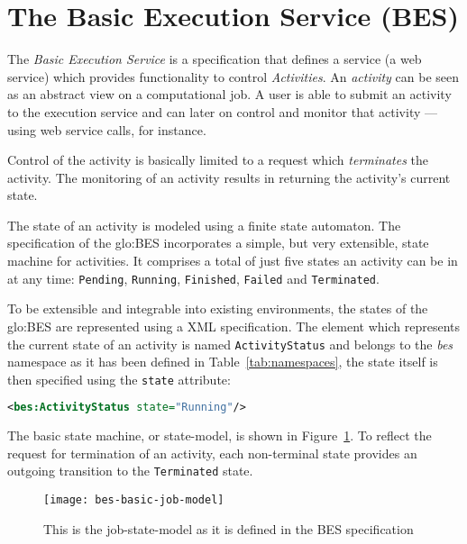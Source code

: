 \section[The Basic Execution Service]{The Basic Execution Service (BES)}
\label{sec:fundamentals:bes}

The \emph{Basic Execution Service} \cite{ogsa-bes} is a specification that
defines  a service  (\eg a  web service)  which provides  functionality to
control \emph{Activities}.  An \emph{activity}  can be seen as an abstract
view on a computational job. A user  is able to submit an activity to the
execution service and  can later on control and  monitor that activity ---
using web service calls, for instance.

Control  of  the  activity  is   basically  limited  to  a  request  which
\emph{terminates} the  activity. The monitoring of an  activity results in
returning the activity's current state.

The state  of an activity is  modeled using a finite  state automaton. The
specification  of  the  \gls{glo:BES}  incorporates  a  simple,  but  very
extensible, state  machine for  activities. It comprises  a total  of just
five  states  an  activity  can  be  in  at  any  time:  \texttt{Pending},
\texttt{Running},       \texttt{Finished},       \texttt{Failed}       and
\texttt{Terminated}. 

To be extensible and integrable  into existing environments, the states of
the \gls{glo:BES}  are represented using a XML  specification. The element
which   represents   the  current   state   of   an   activity  is   named
\texttt{ActivityStatus} and belongs to  the \emph{bes} namespace as it has
been  defined  in Table~\ref{tab:namespaces},  the  state  itself is  then
specified using the \texttt{state} attribute:

\begin{lstlisting}[language=XML]
  <bes:ActivityStatus state="Running"/>
\end{lstlisting}

The    basic    state   machine,    or    state-model,    is   shown    in
Figure~\ref{fig:bes-basic}. To  reflect the request for  termination of an
activity, each  non-terminal state provides an outgoing  transition to the
\texttt{Terminated} state.

\begin{figure}[h]
  \centering
  \texttt{[image: bes-basic-job-model]}
  \caption[Basic BES Job-State-Model]{This is the job-state-model as it is
    defined in the BES specification \cite{ogsa-bes}}
  \label{fig:bes-basic}
\end{figure}

